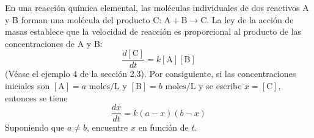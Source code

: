 \item En una reacción química elemental, las moléculas individuales de dos reactivos A y B forman una molécula del producto C: $\mathrm{A} + \mathrm{B} \to \mathrm{C}$. La ley de la acción de masas establece que la velocidad de reacción es proporcional al producto de las concentraciones de A y B:
    \[ \frac{d[\mathrm{C}]}{dt} = k[\mathrm{A}][\mathrm{B}] \]
    (Véase el ejemplo 4 de la sección 2.3). Por consiguiente, si las concentraciones iniciales son $[\mathrm{A}] = a \text{ moles/L}$ y $[\mathrm{B}] = b \text{ moles/L}$ y se escribe $x = [\mathrm{C}]$, entonces se tiene
    \[ \frac{dx}{dt} = k(a - x)(b - x) \]
    Suponiendo que $a \ne b$, encuentre $x$ en función de $t$.

